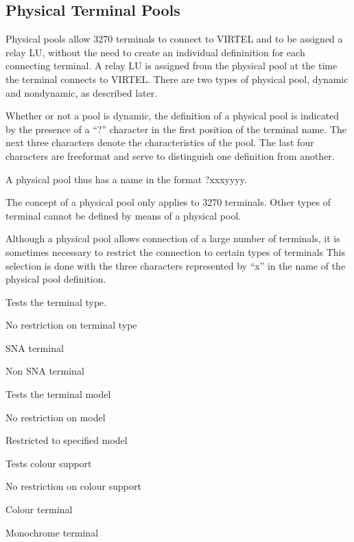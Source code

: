 \documentclass[letterpaper,10pt,english]{sphinxmanual}
\begin{document}
\subsection{Physical Terminal Pools}
\label{\detokenize{connectivity_guide:physical-terminal-pools}}\label{\detokenize{connectivity_guide:index-142}}
\sphinxAtStartPar
Physical pools allow 3270 terminals to connect to VIRTEL and to be assigned a relay LU, without the need to create an individual defininition for each connecting terminal. A relay LU is assigned from the physical pool at the time the terminal connects to VIRTEL. There are two types of physical pool, dynamic and non\sphinxhyphen{}dynamic, as described later.

\sphinxAtStartPar
Whether or not a pool is dynamic, the definition of a physical pool is indicated by the presence of a “?” character in the first position of the terminal name. The next three characters denote the characteristics of the pool. The last four characters are free\sphinxhyphen{}format and serve to distinguish one definition from another.

\sphinxAtStartPar
A physical pool thus has a name in the format ?xxxyyyy.

\sphinxAtStartPar
The concept of a physical pool only applies to 3270 terminals. Other types of terminal cannot be defined by means of a physical pool.

\sphinxAtStartPar
Although a physical pool allows connection of a large number of terminals, it is sometimes necessary to restrict the connection to certain types of terminals This selection is done with the three characters represented by “x” in the name of the physical pool definition.
\begin{description}
\sphinxAtStartPar
Tests the terminal type.
\begin{description}
\sphinxlineitem{*}
\sphinxAtStartPar
No restriction on terminal type

\sphinxAtStartPar
SNA terminal

\sphinxAtStartPar
Non SNA terminal

\end{description}

\sphinxAtStartPar
Tests the terminal model
\begin{description}
\sphinxlineitem{*}
\sphinxAtStartPar
No restriction on model

\sphinxAtStartPar
Restricted to specified model

\end{description}

\sphinxAtStartPar
Tests colour support
\begin{description}
\sphinxlineitem{*}
\sphinxAtStartPar
No restriction on colour support

\sphinxAtStartPar
Colour terminal

\sphinxAtStartPar
Monochrome terminal

\end{description}

\end{description}
\end{document}
